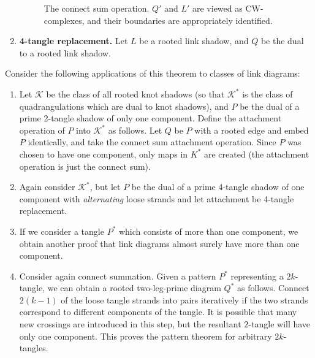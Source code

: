 \documentclass[amsmath,longbibliography,secnumarabic,floatfix,amssymb,nofootinbib,nobibnotes,letterpaper,11pt,notitlepage,preprint]{revtex4-1}
\newcommand{\FlatKnotDia}{\mathscr{K}}
\newcommand{\KnotShad}{\FlatKnotDia}
\begin{document}
\begin{enumerate}
\begin{figure}[h!]
    \caption{The connect sum operation. $Q'$ and $L'$ are viewed as CW-complexes, and their
      boundaries are appropriately identified.}
    \label{fig:cs_topology}
  \end{figure}
\item \textbf{4-tangle replacement.} Let $L$ be a rooted link shadow, and $Q$ be the dual to a
  rooted link shadow.
\end{enumerate}


Consider the following applications of this theorem to classes of link diagrams:
\begin{enumerate}
\item Let $\KnotShad$ be the class of all rooted knot shadows (so that $\KnotShad^*$ is the class of
  quadrangulations which are dual to knot shadows), and $P$ be the dual of a prime 2-tangle shadow
  of only one component. Define the attachment operation of $P$ into $\KnotShad^*$ as follows. Let
  $Q$ be $P$ with a rooted edge and embed $P$ identically, and take the connect sum attachment
  operation. Since $P$ was chosen to have one component, only maps in $K^*$ are created (the
  attachment operation is just the connect sum).
\item Again consider $\KnotShad^*$, but let $P$ be the dual of a prime 4-tangle shadow of one
  component with \emph{alternating} loose strands and let attachment be 4-tangle replacement.
\item If we consider a tangle $P^*$ which consists of more than one component, we obtain another
  proof that link diagrams almost surely have more than one component.
\item Consider again connect summation. Given a pattern $P^*$ representing a $2k$-tangle, we can
  obtain a rooted two-leg-prime diagram $Q^*$ as follows. Connect $2(k-1)$ of the loose tangle
  strands into pairs iteratively if the two strands correspond to different components of the
  tangle. It is possible that many new crossings are introduced in this step, but the resultant
  $2$-tangle will have only one component. This proves the pattern theorem for arbitrary
  $2k$-tangles.
\end{enumerate}
\end{document}
